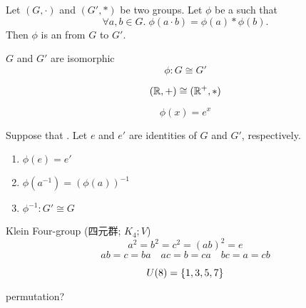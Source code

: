 
\begin{frame}
  \begin{definition}[Isomorphism (同构)]
    Let $(G, \cdot)$ and $(G', \ast)$ be two groups.
    Let $\phi$ be a  such that
    \[
      \forall a, b \in G.\; \phi(a \cdot b) = \phi(a) \ast \phi(b).
    \]
    Then $\phi$ is an  from $G$ to $G'$.
  \end{definition}

  \pause
  \vspace{0.50cm}
  \begin{center}
    $G$ and $G'$ are isomorphic
    \[
      \phi: G \cong G'
    \]
  \end{center}
\end{frame}

\begin{frame}{}
  \begin{exampleblock}{}
    \[
      (\mathbb{R}, +) \cong (\mathbb{R}^{+}, \ast)
    \]
  \end{exampleblock}

  \pause
  \[
    \phi(x) = e^{x}
  \]
\end{frame}

\begin{frame}{}
  \begin{theorem}
    Suppose that .
    Let $e$ and $e'$ are identities of $G$ and $G'$, respectively.

    \begin{enumerate}[(1)]
      \setlength{\itemsep}{6pt}
      \item $\phi(e) = e'$
      \item $\phi(a^{-1}) = (\phi(a))^{-1}$
      \item $\phi^{-1}: G' \cong G$
    \end{enumerate}
  \end{theorem}
\end{frame}

\begin{frame}{}
  \begin{exampleblock}{Klein Four-group (四元群; $K_{4}; V$)}
    \[
      a^2 = b^2 = c^2 = (ab)^{2} = e
    \]
    \[
      ab = c = ba \quad ac = b = ca \quad bc = a = cb
    \]

    \pause
    \[
      U(8) = \{1, 3, 5, 7\}
    \]

    permutation?
  \end{exampleblock}
\end{frame}

\begin{frame}{}
\end{frame}
